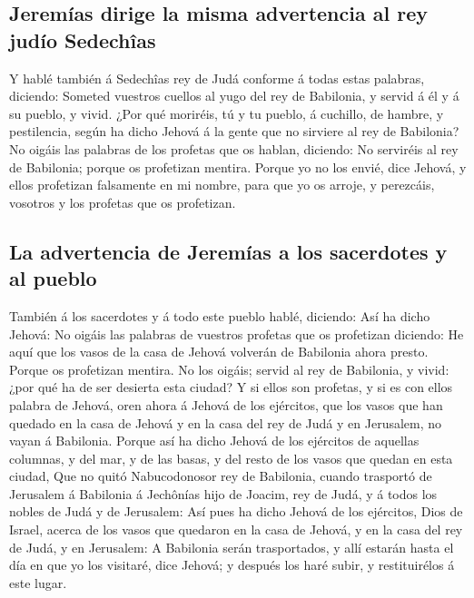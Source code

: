 \hypertarget{jeremuxedas-dirige-la-misma-advertencia-al-rey-juduxedo-sedechuxeeas}{%
\subsection{Jeremías dirige la misma advertencia al rey judío
Sedechîas}\label{jeremuxedas-dirige-la-misma-advertencia-al-rey-juduxedo-sedechuxeeas}}

 Y hablé también á Sedechîas rey de Judá conforme á todas
estas palabras, diciendo: Someted vuestros cuellos al yugo del rey de
Babilonia, y servid á él y á su pueblo, y vivid.  ¿Por
qué moriréis, tú y tu pueblo, á cuchillo, de hambre, y pestilencia,
según ha dicho Jehová á la gente que no sirviere al rey de Babilonia?
 No oigáis las palabras de los profetas que os hablan,
diciendo: No serviréis al rey de Babilonia; porque os profetizan
mentira.  Porque yo no los envié, dice Jehová, y ellos
profetizan falsamente en mi nombre, para que yo os arroje, y perezcáis,
vosotros y los profetas que os profetizan.

\hypertarget{la-advertencia-de-jeremuxedas-a-los-sacerdotes-y-al-pueblo}{%
\subsection{La advertencia de Jeremías a los sacerdotes y al
pueblo}\label{la-advertencia-de-jeremuxedas-a-los-sacerdotes-y-al-pueblo}}

 También á los sacerdotes y á todo este pueblo hablé,
diciendo: Así ha dicho Jehová: No oigáis las palabras de vuestros
profetas que os profetizan diciendo: He aquí que los vasos de la casa de
Jehová volverán de Babilonia ahora presto. Porque os profetizan mentira.
 No los oigáis; servid al rey de Babilonia, y vivid: ¿por
qué ha de ser desierta esta ciudad?  Y si ellos son
profetas, y si es con ellos palabra de Jehová, oren ahora á Jehová de
los ejércitos, que los vasos que han quedado en la casa de Jehová y en
la casa del rey de Judá y en Jerusalem, no vayan á Babilonia.
 Porque así ha dicho Jehová de los ejércitos de aquellas
columnas, y del mar, y de las basas, y del resto de los vasos que quedan
en esta ciudad,  Que no quitó Nabucodonosor rey de
Babilonia, cuando trasportó de Jerusalem á Babilonia á Jechônías hijo de
Joacim, rey de Judá, y á todos los nobles de Judá y de Jerusalem:
 Así pues ha dicho Jehová de los ejércitos, Dios de
Israel, acerca de los vasos que quedaron en la casa de Jehová, y en la
casa del rey de Judá, y en Jerusalem:  A Babilonia serán
trasportados, y allí estarán hasta el día en que yo los visitaré, dice
Jehová; y después los haré subir, y restituirélos á este lugar.

